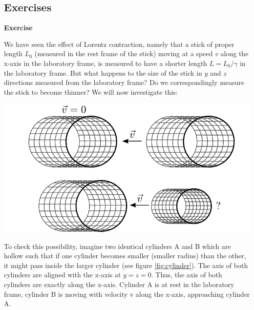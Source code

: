 {\begin{multicols}{2}
\newpage


\section{Exercises}
\newcommand{\newproblem}[1]{\label{#1}{\bf Exercise \refproblem{#1}}}

\newproblem{prob:lorentzyz}

We have seen the effect of Lorentz contraction, namely that a stick of proper length $L_0$ (measured in the rest frame of the stick) moving at a speed $v$ along the x-axis in the laboratory frame, is measured to have a shorter length $L=L_0/\gamma$ in the laboratory frame. But what happens to the size of the stick in $y$ and $z$ directions measured from the laboratory frame? Do we correspondingly measure the stick to become thinner? We will now investigate this:

\begin{Figure}
\centering
\includegraphics[width=\textwidth]{fig_7-8.pdf}
\end{Figure}

To check this possibility, imagine two identical cylinders A and B which are hollow such that if one cylinder becomes smaller (smaller radius) than the other, it might pass inside the larger cylinder (see figure \ref{fig:cylinder}). The axis of both cylinders are aligned with the x-axis at $y=z=0$. Thus, the axis of both cylinders are exactly along the x-axis. Cylinder A is at rest in the laboratory frame, cylinder B is moving with velocity v along the x-axis, approaching cylinder A. 


\end{multicols}}
